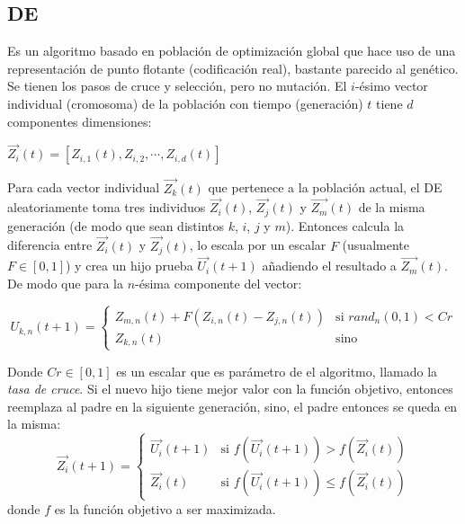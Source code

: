 \subsection{DE} \label{sect:metade}

Es un algoritmo basado en poblaci\'on de
optimizaci\'on global que hace uso de una representaci\'on de punto flotante
(codificaci\'on real), bastante parecido al gen\'etico. Se tienen los pasos de cruce 
y selecci\'on, pero no mutaci\'on.
El $i$-\'esimo vector individual (cromosoma)
de la poblaci\'on con tiempo (generaci\'on) $t$ tiene $d$ componentes
dimensiones:

\begin{center}
$ \overrightarrow{Z_i}(t) = [ Z_{i,1}(t), Z_{i,2}, \cdots, Z_{i,d}(t) ] $
\end{center}

Para cada vector individual $\overrightarrow{Z_k}(t)$ que pertenece
a la poblaci\'on actual, el DE aleatoriamente toma tres individuos
$\overrightarrow{Z_i}(t)$, $\overrightarrow{Z_j}(t)$ y $\overrightarrow{Z_m}(t)$ de la misma generaci\'on (de modo que sean distintos $k$, 
$i$, $j$ y $m$). Entonces calcula la diferencia entre $\overrightarrow{Z_i}(t)$ y $\overrightarrow{Z_j}(t)$, lo escala por un escalar $F$
(usualmente $F \in [0, 1]$) y crea un hijo prueba $\overrightarrow{U_i}(t + 1)$ a\~nadiendo el resultado a $\overrightarrow{Z_m}(t)$. De modo
que para la $n$-\'esima componente del vector:

\[
  U_{k,n}(t+1) =
  \begin{cases}
    Z_{m,n}(t) + F(Z_{i,n}(t) - Z_{j,n}(t))  & \text{si } rand_n(0,1) < Cr\\
    Z_{k,n}(t)                               & \text{sino}
  \end{cases}
\]

Donde $Cr \in [0, 1]$ es un escalar que es par\'ametro de el algoritmo,
llamado la \emph{tasa de cruce}. Si el nuevo hijo tiene mejor valor
con la funci\'on objetivo, entonces reemplaza al padre en la siguiente
generaci\'on, sino, el padre entonces se queda en la misma:
\[
  \overrightarrow{Z_i}(t+1) =
  \begin{cases}
    \overrightarrow{U_i}(t+1) & \text{si } f(\overrightarrow{U_i}(t+1)) > f(\overrightarrow{Z_i}(t)) \\
    \overrightarrow{Z_i}(t)   & \text{si } f(\overrightarrow{U_i}(t+1)) \leq f(\overrightarrow{Z_i}(t))
  \end{cases}
\]
donde $f$ es la funci\'on objetivo a ser maximizada.

